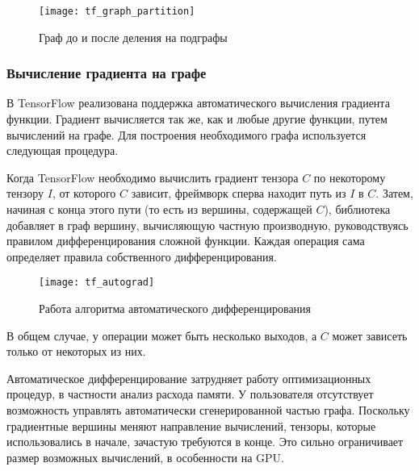 \begin{figure}[h]
    \centering
    \texttt{[image: tf\_graph\_partition]}
    \caption{Граф до и после деления на подграфы}
    \label{fig:tf_graph_partition}
\end{figure}

\subsubsection{Вычисление градиента на графе}

В TensorFlow реализована поддержка автоматического вычисления градиента функции.
Градиент вычисляется так же, как и любые другие функции, путем вычислений на
графе. Для построения необходимого графа используется следующая процедура.

Когда TensorFlow необходимо вычислить градиент тензора $C$ по некоторому
тензору $I$, от которого $C$ зависит, фреймворк сперва находит путь из
$I$ в $C$. Затем, начиная с конца этого пути (то есть из вершины, содержащей $C$),
библиотека добавляет в граф вершину, вычисляющую частную производную,
руководствуясь правилом дифференцирования сложной функции. Каждая операция сама
определяет правила собственного дифференцирования.

\begin{figure}[h]
    \centering
    \texttt{[image: tf\_autograd]}
    \caption{Работа алгоритма автоматического дифференцирования}
    \label{fig:tf_autograd}
\end{figure}

В общем случае, у операции может быть несколько выходов, а $C$ может зависеть
только от некоторых из них.

Автоматическое дифференцирование затрудняет работу оптимизационных процедур,
в частности анализ расхода памяти. У пользователя отсутствует возможность
управлять автоматически сгенерированной частью графа. Поскольку градиентные
вершины меняют направление вычислений, тензоры, которые использовались в начале,
зачастую требуются в конце. Это сильно ограничивает размер возможных вычислений,
в особенности на GPU.

